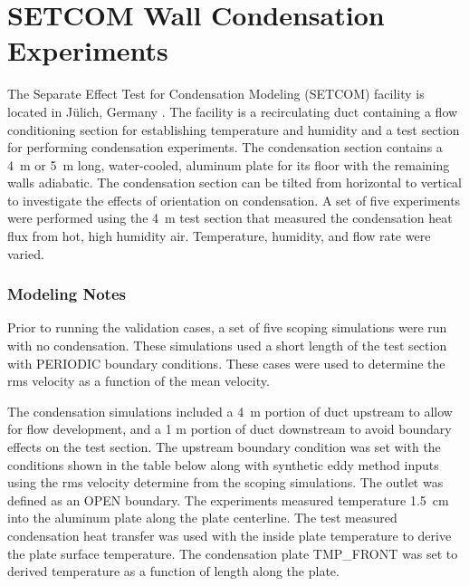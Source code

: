 \FloatBarrier

\section{SETCOM Wall Condensation Experiments}
\label{SETCOM_Cond_Description}

The Separate Effect Test for Condensation Modeling (SETCOM) facility is located in J\"{u}lich, Germany \cite{setcom_cfd}. The facility is a recirculating duct containing a flow conditioning section for establishing temperature and humidity and a test section for performing condensation experiments. The condensation section contains a 4~m or 5~m long, water-cooled, aluminum plate for its floor with the remaining walls adiabatic. The condensation section can be tilted from horizontal to vertical to investigate the effects of orientation on condensation. A set of five experiments were performed using the 4~m test section that measured the condensation heat flux from hot, high humidity air. Temperature, humidity, and flow rate were varied.

\subsubsection{Modeling Notes}

Prior to running the validation cases, a set of five scoping simulations were run with no condensation. These simulations used a short length of the test section with {\ct PERIODIC} boundary conditions. These cases were used to determine the rms velocity as a function of the mean velocity.

The condensation simulations included a 4~m portion of duct upstream to allow for flow development, and a 1 m portion of duct downstream to avoid boundary effects on the test section. The upstream boundary condition was set with the conditions shown in the table below along with synthetic eddy method inputs using the rms velocity determine from the scoping simulations. The outlet was defined as an {\ct OPEN} boundary. The experiments measured temperature 1.5~cm into the aluminum plate along the plate centerline. The test measured condensation heat transfer was used with the inside plate temperature to derive the plate surface temperature. The condensation plate {\ct TMP\_FRONT} was set to derived temperature as a function of length along the plate.

